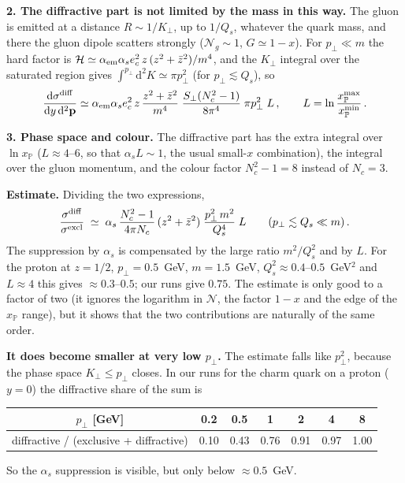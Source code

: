 \documentclass[12pt]{article}
\newcommand{\xpo}{x_{\mathbb{P}}}
\begin{document}
\textbf{2. The diffractive part is not limited by the mass in this way.} The gluon is emitted at a
distance $R\sim1/K_\perp$, up to $1/Q_s$, whatever the quark mass, and there the gluon dipole scatters
strongly ($\mathcal{N}_g\sim1$, $G\simeq1-x$). For $p_\perp\ll m$ the hard factor is
$\mathcal{H}\simeq\alpha_{\rm em}\alpha_se_c^2\,z\,(z^2+\bar z^2)/m^4$, and the $K_\perp$ integral over the
saturated region gives $\int^{p_\perp}\mathrm{d}^2K\simeq\pi p_\perp^2$ (for $p_\perp\lesssim Q_s$), so
\[
  \frac{\mathrm{d}\sigma^{\rm diff}}{\mathrm{d}y\,\mathrm{d}^2\mathbf{p}}
  \simeq\alpha_{\rm em}\alpha_se_c^2\,z\,\frac{z^2+\bar z^2}{m^4}\;\frac{S_\perp(N_c^2-1)}{8\pi^4}\;\pi p_\perp^2\;L\,,
  \qquad L=\ln\frac{\xpo^{\max}}{\xpo^{\min}}\,.
\]

\textbf{3. Phase space and colour.} The diffractive part has the extra integral over $\ln\xpo$
($L\approx4$--6, so that $\alpha_sL\sim1$, the usual small-$x$ combination), the integral over the
gluon momentum, and the colour factor $N_c^2-1=8$ instead of $N_c=3$.

\textbf{Estimate.} Dividing the two expressions,
\[
  \frac{\sigma^{\rm diff}}{\sigma^{\rm excl}}\;\simeq\;
  \alpha_s\,\frac{N_c^2-1}{4\pi N_c}\,(z^2+\bar z^2)\;\frac{p_\perp^2\,m^2}{Q_s^4}\;L
  \qquad(p_\perp\lesssim Q_s\ll m)\,.
\]
The suppression by $\alpha_s$ is compensated by the large ratio $m^2/Q_s^2$ and by $L$. For the
proton at $z=1/2$, $p_\perp=0.5$~GeV, $m=1.5$~GeV, $Q_s^2\approx0.4$--$0.5$~GeV$^2$ and $L\approx4$ this
gives $\approx0.3$--$0.5$; our runs give $0.75$. The estimate is only good to a factor of two (it
ignores the logarithm in $\mathcal{N}$, the factor $1-x$ and the edge of the $\xpo$ range), but it shows
that the two contributions are naturally of the same order.

\textbf{It does become smaller at very low $p_\perp$.} The estimate falls like $p_\perp^2$, because the
phase space $K_\perp\leq p_\perp$ closes. In our runs for the charm quark on a proton ($y=0$) the
diffractive share of the sum is
\begin{center}
\begin{tabular}{ccccccc}
\toprule
$p_\perp$ [GeV] & 0.2 & 0.5 & 1 & 2 & 4 & 8 \\
\midrule
diffractive / (exclusive + diffractive) & 0.10 & 0.43 & 0.76 & 0.91 & 0.97 & 1.00 \\
\bottomrule
\end{tabular}
\end{center}
So the $\alpha_s$ suppression is visible, but only below $\approx0.5$~GeV.
\end{document}
